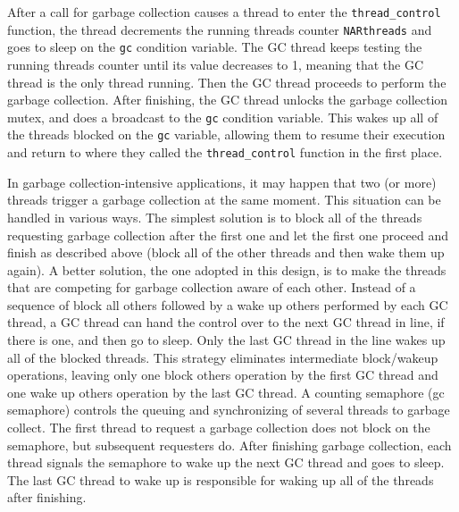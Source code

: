 After a call for garbage collection causes a thread to enter the
\texttt{thread\_control} function, the thread decrements the running
threads counter \texttt{NARthreads} and goes to sleep on the \texttt{gc}
condition variable. The GC thread keeps testing the running threads counter
until its value decreases to 1, meaning that the GC thread is the only
thread running. Then the GC thread proceeds to perform the garbage
collection. After finishing, the GC thread unlocks the garbage collection
mutex, and does a broadcast to the \texttt{gc} condition variable. This
wakes up all of the threads blocked on the \texttt{gc} variable, allowing
them to resume their execution and return to where they called the
\texttt{thread\_control} function in the first place.

In garbage collection-intensive applications, it may happen that two (or
more) threads trigger a garbage collection at the same moment. This
situation can be handled in various ways.  The simplest solution is to
block all of the threads requesting garbage collection after the first one
and let the first one proceed and finish as described above (block all of
the other threads and then wake them up again). A better solution, the one
adopted in this design, is to make the threads that are competing for
garbage collection aware of each other. Instead of a sequence of block all
others followed by a wake up others performed by each GC thread, a GC
thread can hand the control over to the next GC thread in line, if there is
one, and then go to sleep. Only the last GC thread in the line wakes up all
of the blocked threads. This strategy eliminates intermediate block/wakeup
operations, leaving only one block others operation by the first GC thread
and one wake up others operation by the last GC thread. A counting
semaphore (gc semaphore) controls the queuing and synchronizing of several
threads to garbage collect.  The first thread to request a garbage
collection does not block on the semaphore, but subsequent requesters
do. After finishing garbage collection, each thread signals the semaphore
to wake up the next GC thread and goes to sleep. The last GC thread to wake
up is responsible for waking up all of the threads after finishing.

